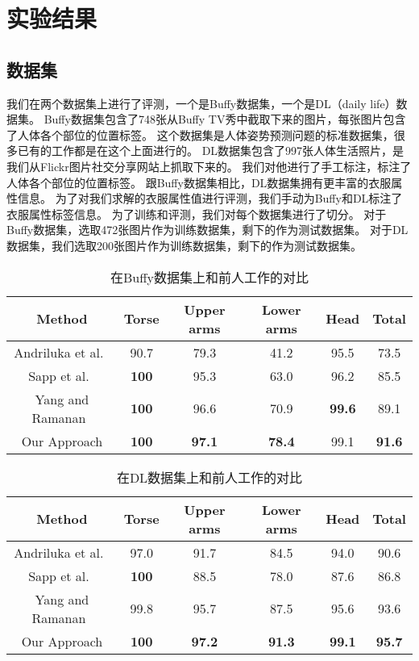
\chapter{实验结果}
\label{chap:exp}
\section{数据集}
我们在两个数据集上进行了评测，一个是Buffy数据集，一个是DL（daily life）数据集。
Buffy数据集包含了748张从Buffy TV秀中截取下来的图片，每张图片包含了人体各个部位的位置标签。
这个数据集是人体姿势预测问题的标准数据集，很多已有的工作都是在这个上面进行的。
DL数据集包含了997张人体生活照片，是我们从Flickr图片社交分享网站上抓取下来的。
我们对他进行了手工标注，标注了人体各个部位的位置标签。
跟Buffy数据集相比，DL数据集拥有更丰富的衣服属性信息。
为了对我们求解的衣服属性值进行评测，我们手动为Buffy和DL标注了衣服属性标签信息。
为了训练和评测，我们对每个数据集进行了切分。
对于Buffy数据集，选取472张图片作为训练数据集，剩下的作为测试数据集。
对于DL数据集，我们选取200张图片作为训练数据集，剩下的作为测试数据集。

\begin{table}
\centering
\caption{在Buffy数据集上和前人工作的对比}
\begin{tabular}{|c|c|c|c|c|c|} \hline
    Method & Torse & Upper arms & Lower arms & Head & Total \\ \hline
Andriluka et al.~\cite{cvpr09} &  90.7 & 79.3 & 41.2 & 95.5 & 73.5 \\ \hline
Sapp et al.~\cite{eccv10} & \textbf{100} & 95.3 & 63.0 & 96.2 & 85.5 \\ \hline
Yang and Ramanan~\cite{deva11} & \textbf{100} & 96.6 & 70.9 & \textbf{99.6} & 89.1 \\ \hline
Our Approach & \textbf{100} & \textbf{97.1} & \textbf{78.4} & 99.1 & \textbf{91.6} \\ \hline
\end{tabular}
\label{tb:buffy}
\end{table}

\begin{table}
\centering
\caption{在DL数据集上和前人工作的对比}
\begin{tabular}{|c|c|c|c|c|c|} \hline
    Method & Torse & Upper arms & Lower arms & Head & Total \\ \hline
Andriluka et al.~\cite{cvpr09} &  97.0 & 91.7 & 84.5 & 94.0 & 90.6 \\ \hline
Sapp et al.~\cite{eccv10} & \textbf{100} & 88.5 & 78.0 & 87.6 & 86.8 \\ \hline
Yang and Ramanan~\cite{deva11} & 99.8 & 95.7 & 87.5 & 95.6 & 93.6 \\ \hline
Our Approach & \textbf{100} & \textbf{97.2} & \textbf{91.3} & \textbf{99.1} & \textbf{95.7} \\ \hline
\end{tabular}
\label{tb:dl}
\end{table}

